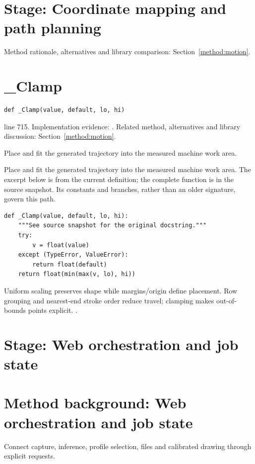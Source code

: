 \section*{Stage: Coordinate mapping and path planning}
Method rationale, alternatives and library comparison: Section~\ref{method:motion}.
\section{\_Clamp}\label{fn:web-server:-Clamp}
\begin{lstlisting}[style=sig]
def _Clamp(value, default, lo, hi)
\end{lstlisting}
 line 715. Implementation evidence: \cite{code2026}. Related method, alternatives and library discussion: Section~\ref{method:motion}.


Place and fit the generated trajectory into the measured machine work area.


Place and fit the generated trajectory into the measured machine work area. The excerpt below is from the current definition; the complete function is in the source snapshot. Its constants and branches, rather than an older signature, govern this path.


\begin{lstlisting}[style=plain]
def _Clamp(value, default, lo, hi):
    """See source snapshot for the original docstring."""
    try:
        v = float(value)
    except (TypeError, ValueError):
        return float(default)
    return float(min(max(v, lo), hi))
\end{lstlisting}
Uniform scaling preserves shape while margins/origin define placement. Row grouping and nearest-end stroke order reduce travel; clamping makes out-of-bounds points explicit. \cite{bresenham1965,code2026}.


\section*{Stage: Web orchestration and job state}
\section{Method background: Web orchestration and job state}\label{method:server}
Connect capture, inference, profile selection, files and calibrated drawing through explicit requests.


